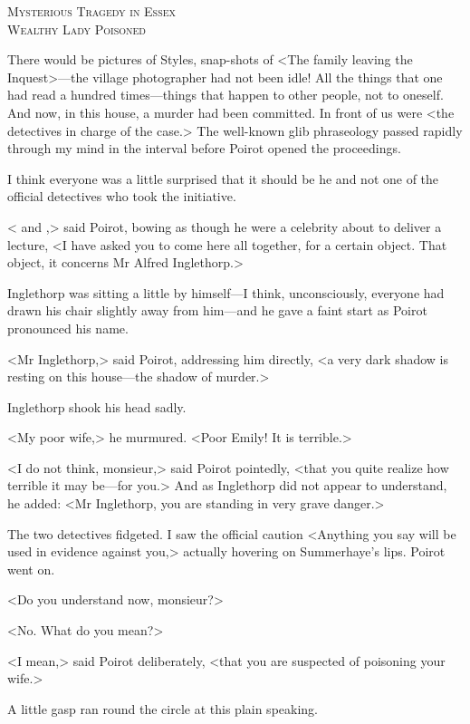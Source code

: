 \begin{center}\scshape\large
Mysterious Tragedy in Essex\\
Wealthy Lady Poisoned
\end{center}

 There would be pictures of Styles, snap-shots of <The family leaving the Inquest>—the village photographer had not been idle! All the things that one had read a hundred times—things that happen to other people, not to oneself. And now, in this house, a murder had been committed. In front of us were <the detectives in charge of the case.> The well-known glib phraseology passed rapidly through my mind in the interval before Poirot opened the proceedings. 

 I think everyone was a little surprised that it should be he and not one of the official detectives who took the initiative. 

 < and ,> said Poirot, bowing as though he were a celebrity about to deliver a lecture, <I have asked you to come here all together, for a certain object. That object, it concerns Mr Alfred Inglethorp.> 

 Inglethorp was sitting a little by himself—I think, unconsciously, everyone had drawn his chair slightly away from him—and he gave a faint start as Poirot pronounced his name. 

 <Mr Inglethorp,> said Poirot, addressing him directly, <a very dark shadow is resting on this house—the shadow of murder.> 

 Inglethorp shook his head sadly. 

 <My poor wife,> he murmured. <Poor Emily! It is terrible.> 

 <I do not think, monsieur,> said Poirot pointedly, <that you quite realize how terrible it may be—for you.> And as Inglethorp did not appear to understand, he added: <Mr Inglethorp, you are standing in very grave danger.> 

 The two detectives fidgeted. I saw the official caution <Anything you say will be used in evidence against you,> actually hovering on Summerhaye's lips. Poirot went on. 

 <Do you understand now, monsieur?> 

 <No. What do you mean?> 

 <I mean,> said Poirot deliberately, <that you are suspected of poisoning your wife.> 

 A little gasp ran round the circle at this plain speaking. 

